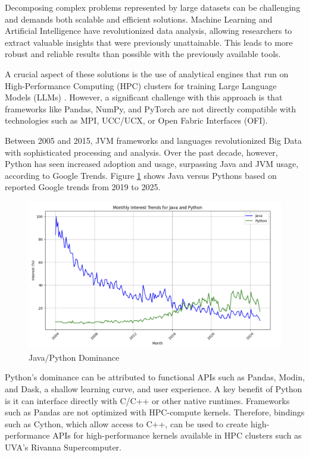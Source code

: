 Decomposing complex problems represented by large datasets can be challenging and demands both scalable and efficient solutions. Machine Learning and Artificial Intelligence have revolutionized data analysis, allowing researchers to extract valuable insights that were previously unattainable. This leads to more robust and reliable results than possible with the previously available tools.

A crucial aspect of these solutions is the use of analytical engines that run on High-Performance Computing (HPC) clusters for training Large Language Models (LLMs) \cite{abeykoon2020data}. However, a significant challenge with this approach is that frameworks like Pandas, NumPy, and PyTorch are not directly compatible with technologies such as MPI, UCC/UCX, or Open Fabric Interfaces (OFI). 

Between 2005 and 2015, JVM frameworks and languages revolutionized Big Data with sophisticated processing and analysis. Over the past decade, however, Python has seen increased adoption and usage, surpassing Java and JVM usage, according to Google Trends.  Figure \ref{fig:javapythonadoption} shows Java versus Pythons based on reported Google trends from 2019 to 2025.  

\begin{figure}[ht]
    \begin{center}
    \includegraphics[width=\linewidth]{source/Figure/pythonjavainterest.png}
    \end{center}
    \caption{Java/Python Dominance}
    \label{fig:javapythonadoption}
\end{figure}

Python's dominance can be attributed to functional APIs such as Pandas, Modin, and Dask, a shallow learning curve, and user experience\cite{pererathesis}.  A key benefit of Python is it can interface directly with C/C++ or other native runtimes. Frameworks such as Pandas are not optimized with HPC-compute kernels.  Therefore, bindings such as Cython, which allow access to C++, can be used to create high-performance APIs for high-performance kernels available in HPC clusters such as UVA's Rivanna Supercomputer\cite{shan2022hybrid}.

